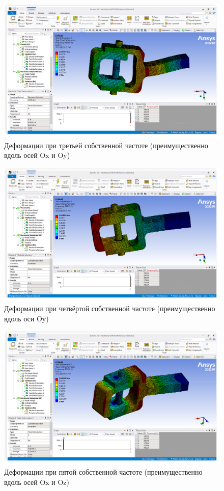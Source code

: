 \begin{figure}[H] 
	\center
	\includegraphics[width=\textwidth]{images/mod3.png}
	\caption{Деформации при третьей собственной частоте (преимущественно вдоль осей Ox и Oy)}
	\label{fig:mod3}
\end{figure}

\begin{figure}[H] 
	\center
	\includegraphics[width=\textwidth]{images/mod4.png}
	\caption{Деформации при четвёртой собственной частоте (преимущественно вдоль оси Oy)}
	\label{fig:mod4}
\end{figure}

\begin{figure}[H] 
	\center
	\includegraphics[width=\textwidth]{images/mod5.png}
	\caption{Деформации при пятой собственной частоте (преимущественно вдоль осей Ox и Oz)}
	\label{fig:mod5}
\end{figure}



